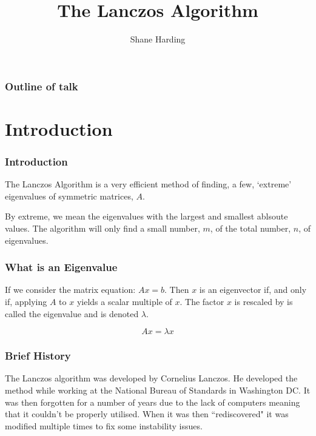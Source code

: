\documentclass[pdf]{beamer}
\title{The Lanczos Algorithm}
\author{Shane Harding}
\begin{document}
\begin{frame}
\titlepage
\end{frame}


\begin{frame}
\frametitle{Outline of talk}
\tableofcontents[]

\end{frame}

\section{Introduction}

\begin{frame}
\tableofcontents[currentsection]
\end{frame}



\begin{frame}
\frametitle{Introduction}
\centering
The Lanczos Algorithm is a very efficient method of finding, a few, `extreme' eigenvalues of symmetric matrices, $A$.

By extreme, we mean the eigenvalues with the largest and smallest ablsoute values. The algorithm will only find a small number, $m$, of the total number, $n$, of eigenvalues.

\end{frame}



\begin{frame}
\frametitle{What is an Eigenvalue}

If we consider the matrix equation: $A x = b$. Then $x$ is an eigenvector if, and only if, applying $A$ to $x$ yields a scalar multiple of $x$. The factor $x$ is rescaled by is called the eigenvalue and is denoted $\lambda$.

\[ A x = \lambda x \]

\end{frame}



\begin{frame}
\centering
\frametitle{Brief History}

The Lanczos algorithm was developed by Cornelius Lanczos. He developed the method while working at the National Bureau of Standards in Washington DC. It was then forgotten for a number of years due to the lack of computers meaning that it couldn't be properly utilised. When it was then ``rediscovered" it was modified multiple times to fix some instability issues.
\end{frame}
\end{document}
